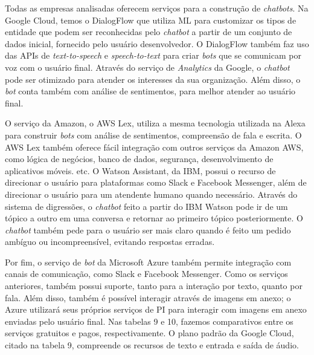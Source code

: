 \documentclass{article}
\begin{document}
Todas as empresas analisadas oferecem serviços para a construção de \textit{chatbots}. Na Google Cloud, temos o DialogFlow que utiliza ML para customizar os tipos de entidade que podem ser reconhecidas pelo \textit{chatbot} a partir de um conjunto de dados inicial, fornecido pelo usuário desenvolvedor. O DialogFlow também faz uso das APIs de \textit{text-to-speech} e \textit{speech-to-text} para criar \textit{bots} que se comunicam por voz com o usuário final. Através do serviço de \textit{Analytics} da Google, o \textit{chatbot} pode ser otimizado para atender os interesses da sua organização. Além disso, o \textit{bot} conta também com análise de sentimentos, para melhor atender ao usuário final. 

O serviço da Amazon, o AWS Lex, utiliza a mesma tecnologia utilizada na Alexa para construir \textit{bots} com análise de sentimentos, compreensão de fala e escrita. O AWS Lex também oferece fácil integração com outros serviços da Amazon AWS, como lógica de negócios, banco de dados, segurança, desenvolvimento de aplicativos móveis. etc. O Watson Assistant, da IBM, possui o recurso de direcionar o usuário para plataformas como Slack e Facebook Messenger, além de direcionar o usuário para um atendente humano quando necessário. Através do sistema de digressões, o \textit{chatbot} feito a partir do IBM Watson pode ir de um tópico a outro em uma conversa e retornar ao primeiro tópico posteriormente. O \textit{chatbot} também pede para o usuário ser mais claro quando é feito um pedido ambíguo ou incompreensível, evitando respostas erradas. 

Por fim, o serviço de \textit{bot} da Microsoft Azure também permite integração com canais de comunicação, como Slack e Facebook Messenger. Como os serviços anteriores, também possui suporte, tanto para a interação por texto, quanto por fala. Além disso, também é possível interagir através de imagens em anexo; o Azure utilizará seus próprios serviços de PI para interagir com imagens em anexo enviadas pelo usuário final. Nas tabelas 9 e 10, fazemos comparativos entre os serviços gratuitos e pagos, respectivamente. 
O plano padrão da Google Cloud, citado na tabela 9, compreende os recursos de texto e entrada e saída de áudio.
\end{document}
